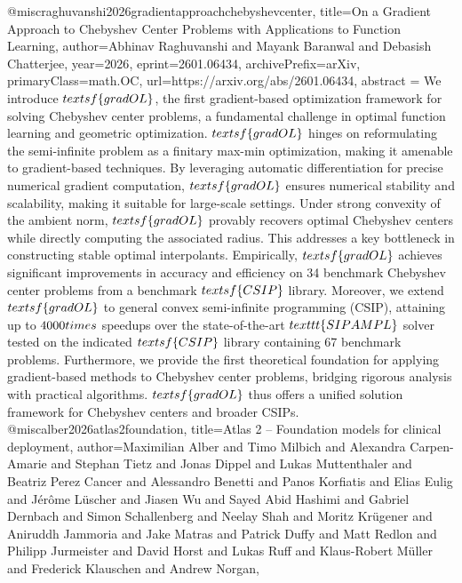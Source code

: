 {}@misc{raghuvanshi2026gradientapproachchebyshevcenter,
      title={On a Gradient Approach to Chebyshev Center Problems with Applications to Function Learning}, 
      author={Abhinav Raghuvanshi and Mayank Baranwal and Debasish Chatterjee},
      year={2026},
      eprint={2601.06434},
      archivePrefix={arXiv},
      primaryClass={math.OC},
      url={https://arxiv.org/abs/2601.06434},
      abstract = {We introduce $\\textsf\{gradOL\}$, the first gradient-based optimization framework for solving Chebyshev center problems, a fundamental challenge in optimal function learning and geometric optimization. $\\textsf\{gradOL\}$ hinges on reformulating the semi-infinite problem as a finitary max-min optimization, making it amenable to gradient-based techniques. By leveraging automatic differentiation for precise numerical gradient computation, $\\textsf\{gradOL\}$ ensures numerical stability and scalability, making it suitable for large-scale settings. Under strong convexity of the ambient norm, $\\textsf\{gradOL\}$ provably recovers optimal Chebyshev centers while directly computing the associated radius. This addresses a key bottleneck in constructing stable optimal interpolants. Empirically, $\\textsf\{gradOL\}$ achieves significant improvements in accuracy and efficiency on 34 benchmark Chebyshev center problems from a benchmark $\\textsf\{CSIP\}$ library. Moreover, we extend $\\textsf\{gradOL\}$ to general convex semi-infinite programming (CSIP), attaining up to $4000\\times$ speedups over the state-of-the-art $\\texttt\{SIPAMPL\}$ solver tested on the indicated $\\textsf\{CSIP\}$ library containing 67 benchmark problems. Furthermore, we provide the first theoretical foundation for applying gradient-based methods to Chebyshev center problems, bridging rigorous analysis with practical algorithms. $\\textsf\{gradOL\}$ thus offers a unified solution framework for Chebyshev centers and broader CSIPs.}
}@misc{alber2026atlas2foundation,
      title={Atlas 2 -- Foundation models for clinical deployment}, 
      author={Maximilian Alber and Timo Milbich and Alexandra Carpen-Amarie and Stephan Tietz and Jonas Dippel and Lukas Muttenthaler and Beatriz Perez Cancer and Alessandro Benetti and Panos Korfiatis and Elias Eulig and Jérôme Lüscher and Jiasen Wu and Sayed Abid Hashimi and Gabriel Dernbach and Simon Schallenberg and Neelay Shah and Moritz Krügener and Aniruddh Jammoria and Jake Matras and Patrick Duffy and Matt Redlon and Philipp Jurmeister and David Horst and Lukas Ruff and Klaus-Robert Müller and Frederick Klauschen and Andrew Norgan},
}
